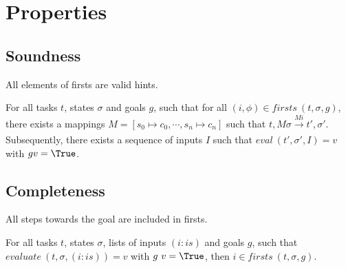 
\section{Properties}
\label{sec:properties}

\subsection{Soundness}

All elements of firsts are valid hints.

\begin{lemma}
  \label{lem:soundfirsts}

  For all tasks $t$, states $\sigma$ and goals $g$,
  such that for all $(i,\phi)\in firsts\ (t,\sigma,g)$,
  there exists a mappings $M = [s_0\mapsto c_0,\cdots,s_n\mapsto c_n]$
  such that $t,M \sigma \xrightarrow[]{M i} t',\sigma'$.
  Subsequently, there exists a sequence of inputs $I$ such that $eval\ (t',\sigma',I) = v$
  with $g v = \True$.
\end{lemma}

\subsection{Completeness}

All steps towards the goal are included in firsts.

\begin{lemma}
  \label{lem:completefirsts}

  For all tasks $t$, states $\sigma$, lists of inputs $(i:is)$ and goals $g$,
  such that $evaluate\ (t,\sigma,(i:is))=v$ with $g\ v =\True$,
  then $i\in firsts\ (t,\sigma,g)$.

\end{lemma}
